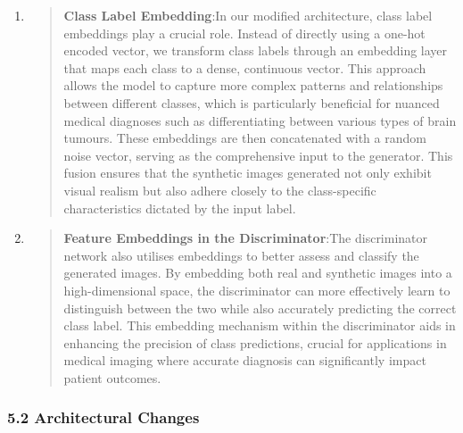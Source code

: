 \documentclass[
]{article}
\begin{document}
\begin{enumerate}
\def\labelenumi{\arabic{enumi}.}
\item
  \begin{quote}
  \textbf{Class Label Embedding}:In our modified architecture, class
  label embeddings play a crucial role. Instead of directly using a
  one-hot encoded vector, we transform class labels through an embedding
  layer that maps each class to a dense, continuous vector. This
  approach allows the model to capture more complex patterns and
  relationships between different classes, which is particularly
  beneficial for nuanced medical diagnoses such as differentiating
  between various types of brain tumours. These embeddings are then
  concatenated with a random noise vector, serving as the comprehensive
  input to the generator. This fusion ensures that the synthetic images
  generated not only exhibit visual realism but also adhere closely to
  the class-specific characteristics dictated by the input label.
  \end{quote}
\item
  \begin{quote}
  \textbf{Feature Embeddings in the Discriminator}:The discriminator
  network also utilises embeddings to better assess and classify the
  generated images. By embedding both real and synthetic images into a
  high-dimensional space, the discriminator can more effectively learn
  to distinguish between the two while also accurately predicting the
  correct class label. This embedding mechanism within the discriminator
  aids in enhancing the precision of class predictions, crucial for
  applications in medical imaging where accurate diagnosis can
  significantly impact patient outcomes.
  \end{quote}
\end{enumerate}

\hypertarget{architectural-changes}{%
\subsubsection{\texorpdfstring{\textbf{5.2 Architectural
Changes}}{5.2 Architectural Changes}}\label{architectural-changes}}
\end{document}
